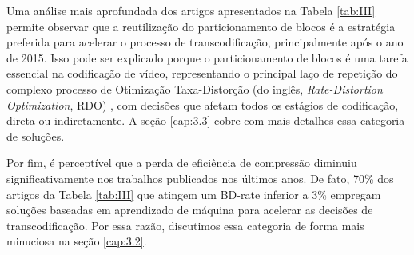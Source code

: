 Uma análise mais aprofundada dos artigos apresentados na Tabela \ref{tab:III} permite observar que a reutilização do particionamento de blocos é a estratégia preferida para acelerar o processo de transcodificação, principalmente após o ano de 2015. Isso pode ser explicado porque o particionamento de blocos é uma tarefa essencial na codificação de vídeo, representando o principal laço de repetição do complexo processo de Otimização Taxa-Distorção (do inglês, \textit{Rate-Distortion Optimization}, RDO) \cite{bib:rdo_sullivan}, com decisões que afetam todos os estágios de codificação, direta ou indiretamente. A seção \ref{cap:3.3} cobre com mais detalhes essa categoria de soluções.

Por fim, é perceptível que a perda de eficiência de compressão diminuiu significativamente nos trabalhos publicados nos últimos anos. De fato, 70\% dos artigos da Tabela \ref{tab:III} que atingem um BD-rate inferior a 3\% empregam soluções baseadas em aprendizado de máquina para acelerar as decisões de transcodificação. Por essa razão, discutimos essa categoria de forma mais minuciosa na seção \ref{cap:3.2}.
